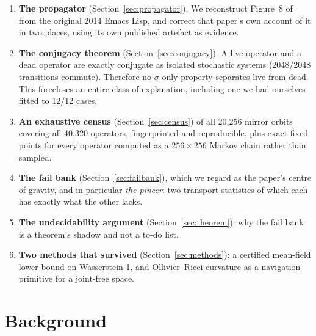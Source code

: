 \documentclass[man,12pt,floatsintext]{apa7}
\newif\ifdraftnotes
\newcommand{\owed}[1]{\ifdraftnotes\textcolor{owedcol}{\small\textbf{[OWED:} #1\textbf{]}}\fi}
\newcommand{\sig}{\sigma}
\begin{document}
\begin{enumerate}
  \item \textbf{The propagator} (Section~\ref{sec:propagator}). We
  reconstruct Figure~8 of \textcite{corneli2015search} from the original
  2014 Emacs Lisp, and correct that paper's own account of it in two
  places, using its own published artefact as evidence.

  \item \textbf{The conjugacy theorem} (Section~\ref{sec:conjugacy}). A
  live operator and a dead operator are exactly conjugate as isolated
  stochastic systems (2048/2048 transitions commute). Therefore no
  $\sig$-only property separates live from dead. This forecloses an
  entire class of explanation, including one we had ourselves fitted to
  12/12 cases.

  \item \textbf{An exhaustive census} (Section~\ref{sec:census}) of all
  20{,}256 mirror orbits covering all 40{,}320 operators, fingerprinted
  and reproducible, plus exact fixed points for every operator computed
  as a $256 \times 256$ Markov chain rather than sampled.

  \item \textbf{The fail bank} (Section~\ref{sec:failbank}), which we
  regard as the paper's centre of gravity, and in particular
  \emph{the pincer}: two transport statistics of which each has exactly
  what the other lacks.

  \item \textbf{The undecidability argument} (Section~\ref{sec:theorem}):
  why the fail bank is a theorem's shadow and not a to-do list.

  \item \textbf{Two methods that survived} (Section~\ref{sec:methods}): a
  certified mean-field lower bound on Wasserstein-1, and Ollivier--Ricci
  curvature as a navigation primitive for a joint-free space.
\end{enumerate}

\section{Background}

\owed{This section is a stub. TN ``Known weaknesses'' item 4 records
related-work grounding as a literature search that has not been run.
\texttt{refs.bib} has the named ancestors --- Langton, Packard,
Mitchell/Crutchfield/Hraber, Culik \& Yu, Kari, Cook, {\v C}encov,
Ollivier --- but nobody has read them \emph{for this paper} and positioned
against them. Do not submit with this section in its present state.}
\end{document}
